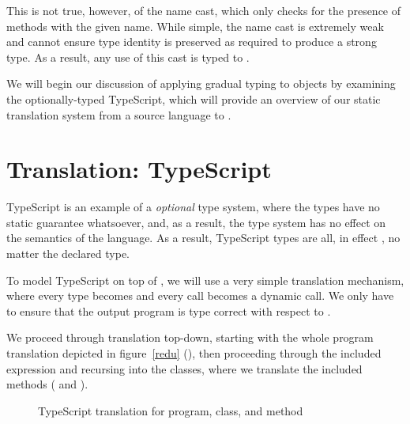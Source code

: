\documentclass[a4paper,USenglish]{tex/lipics-v2016}
\begin{document}
This is not true, however, of the name cast, which only checks for the presence
of methods with the given name. While simple, the name cast is
extremely weak and cannot ensure type identity is preserved as required to
produce a strong \kafka type. As a result, any use of this cast is typed to \any.

We will begin our discussion of applying gradual typing to objects by examining
the optionally-typed TypeScript, which will provide an overview of our static 
translation system from a source language to \kafka.

\section{Translation: TypeScript}

TypeScript is an example of a \emph{optional} type system, where the types have
no static guarantee whatsoever, and, as a result, the type system has no effect
on the semantics of the language. As a result, TypeScript types are all, in
effect \any, no matter the declared type.

To model TypeScript on top of \kafka, we will use a very simple translation 
mechanism, where every type becomes \any and every call becomes a dynamic call.
We only have to ensure that the output program is type correct with respect to
\kafka.

We proceed through translation top-down, starting with the whole program 
translation depicted in figure~\ref{redu} (), then proceeding 
through the included expression and recursing into the classes, where we 
translate the included methods ( and ).

\begin{figure}[!h]
\begin{mathpar}



\end{mathpar}
\caption{TypeScript translation for program, class, and method}
\label{fig:tstrans_cla}
\end{figure}
\end{document}
